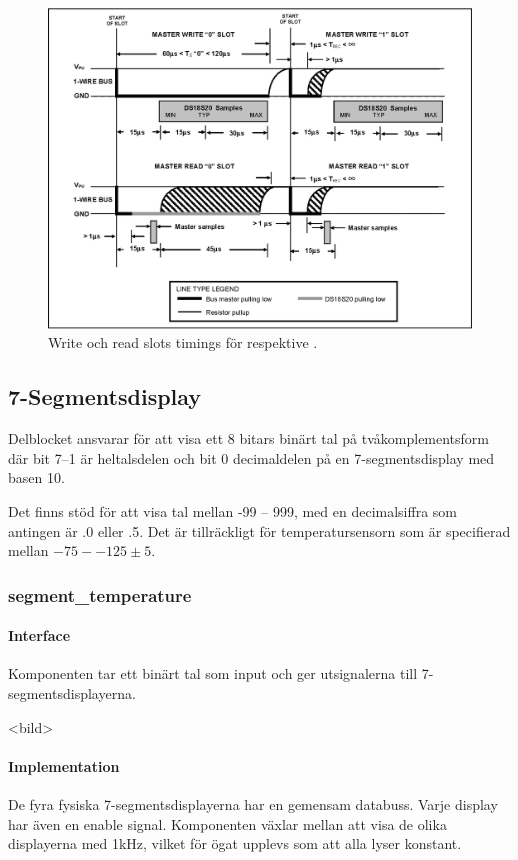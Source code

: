 \begin{figure}
\centering
\includegraphics[width=\textwidth]{write_slot.eps}
\caption{Write och read slots timings för \low{} respektive \high{}.}
\label{fig:rwslots}
\end{figure}



\subsection{7-Segmentsdisplay}\label{sec:7seg}
Delblocket ansvarar för att visa ett 8 bitars binärt tal på tvåkomplementsform där bit 7--1 är heltalsdelen och bit 0 decimaldelen på en 7-segmentsdisplay med basen 10.

Det finns stöd för att visa tal mellan -99 -- 999, med en decimalsiffra som antingen är .0 eller .5. Det är tillräckligt för temperatursensorn som är specifierad mellan $-75 -- 125 \pm5$.
\subsubsection{segment\_temperature}

\paragraph{Interface}
Komponenten tar ett binärt tal som input och ger utsignalerna till 7-segmentsdisplayerna.

<bild>

\paragraph{Implementation}
De fyra fysiska 7-segmentsdisplayerna har en gemensam databuss. Varje display har även en enable signal. Komponenten växlar mellan att visa de olika displayerna med 1kHz, vilket för ögat upplevs som att alla lyser konstant.
